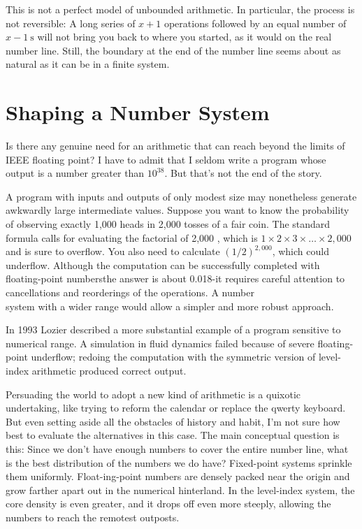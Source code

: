 \documentclass[10pt]{article}
\begin{document}
This is not a perfect model of unbounded arithmetic. In particular, the process is not reversible: A long series of $x+1$ operations followed by an equal number of $x-1 \mathrm{~s}$ will not bring you back to where you started, as it would on the real number line. Still, the boundary at the end of the number line seems about as natural as it can be in a finite system.

\section*{Shaping a Number System}
Is there any genuine need for an arithmetic that can reach beyond the limits of IEEE floating point? I have to admit that I seldom write a program whose output is a number greater than $10^{38}$. But that's not the end of the story.

A program with inputs and outputs of only modest size may nonetheless generate awkwardly large intermediate values. Suppose you want to know the probability of observing exactly 1,000 heads in 2,000 tosses of a fair coin. The standard formula calls for evaluating the factorial of 2,000 , which is $1 \times 2 \times 3 \times \ldots \times 2,000$ and is sure to overflow. You also need to calculate $(1 / 2)^{2,000}$, which could underflow. Although the computation can be successfully completed with floating-point numbersthe answer is about 0.018-it requires careful attention to cancellations and reorderings of the operations. A number\\
system with a wider range would allow a simpler and more robust approach.

In 1993 Lozier described a more substantial example of a program sensitive to numerical range. A simulation in fluid dynamics failed because of severe floating-point underflow; redoing the computation with the symmetric version of level-index arithmetic produced correct output.

Persuading the world to adopt a new kind of arithmetic is a quixotic undertaking, like trying to reform the calendar or replace the qwerty keyboard. But even setting aside all the obstacles of history and habit, I'm not sure how best to evaluate the alternatives in this case. The main conceptual question is this: Since we don't have enough numbers to cover the entire number line, what is the best distribution of the numbers we do have? Fixed-point systems sprinkle them uniformly. Float-ing-point numbers are densely packed near the origin and grow farther apart out in the numerical hinterland. In the level-index system, the core density is even greater, and it drops off even more steeply, allowing the numbers to reach the remotest outposts.
\end{document}
